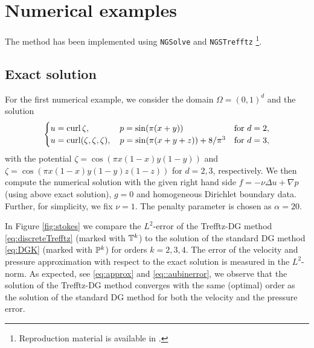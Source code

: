 \documentclass[pdflatex,sn-mathphys,Numbered]{sn-jnl}%
\theoremstyle{remark}%
\theoremstyle{definition}%
\begin{document}

\section{Numerical examples}\label{sec:num}

The method has been implemented using \texttt{NGSolve} \cite{ngsolve} and \texttt{NGSTrefftz} \cite{ngstrefftz} \footnote{Reproduction material is available in \cite{UHPEQG_2023}.}.

\subsection{Exact solution}

For the first numerical example, we consider the domain $\Omega =
(0,1)^d$ and the solution
\begin{align*}
\begin{cases}
  u=\operatorname{\mathrm{curl}} \zeta, \qquad\quad\,\,\,  p = \sin(\pi (x+y)) & \textrm{for } d = 2,\\
  u=\operatorname{\mathrm{curl}} (\zeta,\zeta,\zeta),\quad  p =  \sin(\pi (x+y+z)) + 8/\pi^3 & \textrm{for } d = 3,
\end{cases}
\end{align*}
with the potential %
    $\zeta = \cos(\pi x(1-x) y(1-y))$
and 
$\zeta = \cos(\pi x(1-x) y(1-y) z(1-z))$
for $d=2,3$, respectively. We then compute the numerical solution with
the given right hand side $f=-\nu \Delta u + \nabla p$ (using above
exact solution), $g=0$ and homogeneous Dirichlet boundary data.
Further, for simplicity, we fix $\nu=1$. The penalty parameter is
chosen as $\alpha = 20$.

In Figure \ref{fig:stokes} we compare the $L^2$-error of the Trefftz-DG
method \eqref{eq:discreteTrefftz} (marked with $\mathbb{T}^k$) to the
solution of the standard DG method \eqref{eq:DGK} (marked with
$\mathbb{P}^k$) for orders $k=2,3,4$. The error of the velocity and pressure
approximation with respect to the exact solution is measured in the
$L^2$-norm. As expected, see \eqref{eq:approx} and
\eqref{eq::aubinerror}, we observe that the solution of the Trefftz-DG
method converges with the same (optimal) order as the solution of the
standard DG method for both the velocity and the pressure error.
\end{document}

